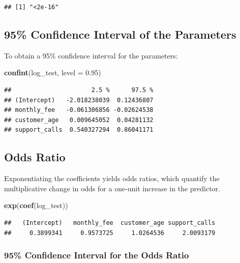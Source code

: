 \documentclass[
]{article}
\newenvironment{Shaded}{\begin{snugshade}}{\end{snugshade}}
\newcommand{\AttributeTok}[1]{\textcolor[rgb]{0.13,0.29,0.53}{#1}}
\newcommand{\FloatTok}[1]{\textcolor[rgb]{0.00,0.00,0.81}{#1}}
\newcommand{\FunctionTok}[1]{\textcolor[rgb]{0.13,0.29,0.53}{\textbf{#1}}}
\newcommand{\NormalTok}[1]{#1}
\begin{document}
\begin{verbatim}
## [1] "<2e-16"
\end{verbatim}

\subsection{95\% Confidence Interval of the
Parameters}\label{confidence-interval-of-the-parameters}

To obtain a 95\% confidence interval for the parameters:

\begin{Shaded}
\begin{Highlighting}[]
\FunctionTok{confint}\NormalTok{(log\_test, }\AttributeTok{level =} \FloatTok{0.95}\NormalTok{)}
\end{Highlighting}
\end{Shaded}

\begin{verbatim}
##                      2.5 %      97.5 %
## (Intercept)   -2.018238039  0.12436807
## monthly_fee   -0.061306856 -0.02624538
## customer_age   0.009645052  0.04281132
## support_calls  0.540327294  0.86041171
\end{verbatim}

\subsection{Odds Ratio}\label{odds-ratio}

Exponentiating the coefficients yields odds ratios, which quantify the
multiplicative change in odds for a one‑unit increase in the predictor.

\begin{Shaded}
\begin{Highlighting}[]
\FunctionTok{exp}\NormalTok{(}\FunctionTok{coef}\NormalTok{(log\_test))}
\end{Highlighting}
\end{Shaded}

\begin{verbatim}
##   (Intercept)   monthly_fee  customer_age support_calls 
##     0.3899341     0.9573725     1.0264536     2.0093179
\end{verbatim}

\subsubsection{95\% Confidence Interval for the Odds
Ratio}\label{confidence-interval-for-the-odds-ratio}
\end{document}
